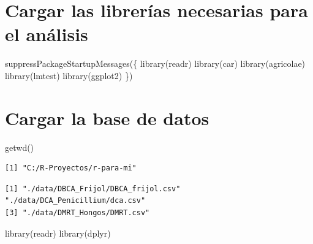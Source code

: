 \documentclass[
  spanish,
  letterpaper,
  DIV=11,
  numbers=noendperiod]{scrreprt}
\newenvironment{Shaded}{\begin{snugshade}}{\end{snugshade}}
\newcommand{\AttributeTok}[1]{\textcolor[rgb]{0.40,0.45,0.13}{#1}}
\newcommand{\ConstantTok}[1]{\textcolor[rgb]{0.56,0.35,0.01}{#1}}
\newcommand{\FunctionTok}[1]{\textcolor[rgb]{0.28,0.35,0.67}{#1}}
\newcommand{\NormalTok}[1]{\textcolor[rgb]{0.00,0.23,0.31}{#1}}
\newcommand{\SpecialCharTok}[1]{\textcolor[rgb]{0.37,0.37,0.37}{#1}}
\newcommand{\StringTok}[1]{\textcolor[rgb]{0.13,0.47,0.30}{#1}}
\begin{document}
\section{Cargar las librerías necesarias para el
análisis}\label{cargar-las-libreruxedas-necesarias-para-el-anuxe1lisis-1}

\begin{Shaded}
\begin{Highlighting}[]
\FunctionTok{suppressPackageStartupMessages}\NormalTok{(\{}
\FunctionTok{library}\NormalTok{(readr) }
\FunctionTok{library}\NormalTok{(car) }
\FunctionTok{library}\NormalTok{(agricolae)}
\FunctionTok{library}\NormalTok{(lmtest) }
\FunctionTok{library}\NormalTok{(ggplot2)}
\NormalTok{\})}
\end{Highlighting}
\end{Shaded}

\section{Cargar la base de datos}\label{cargar-la-base-de-datos}

\begin{Shaded}
\begin{Highlighting}[]
\FunctionTok{getwd}\NormalTok{()}
\end{Highlighting}
\end{Shaded}

\begin{verbatim}
[1] "C:/R-Proyectos/r-para-mi"
\end{verbatim}

\begin{Shaded}
\end{Shaded}

\begin{verbatim}
[1] "./data/DBCA_Frijol/DBCA_frijol.csv" "./data/DCA_Penicillium/dca.csv"    
[3] "./data/DMRT_Hongos/DMRT.csv"       
\end{verbatim}

\begin{Shaded}
\begin{Highlighting}[]
\FunctionTok{library}\NormalTok{(readr)}
\FunctionTok{library}\NormalTok{(dplyr)}
\end{Highlighting}
\end{Shaded}
\end{document}
